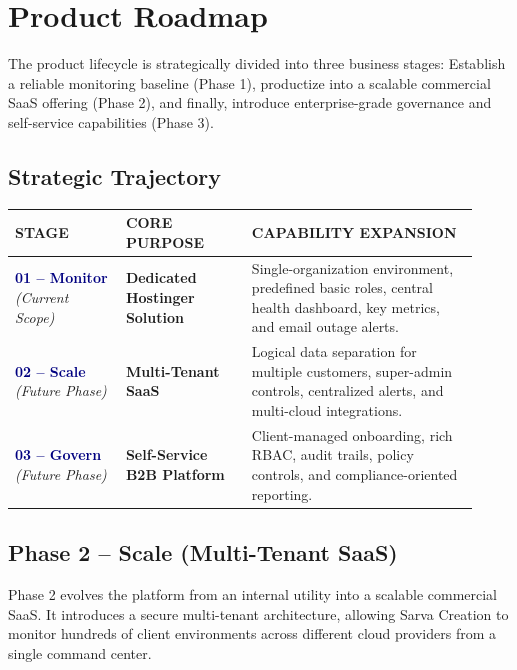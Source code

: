 \documentclass[11pt,a4paper]{article}
\newcommand{\thd}[1]{\textsc{\bfseries\color{white}\fontsize{8.6}{8.6}\selectfont #1}}
\begin{document}
\section{Product Roadmap}

The product lifecycle is strategically divided into three business stages: Establish a reliable monitoring baseline (Phase 1), productize into a scalable commercial SaaS offering (Phase 2), and finally, introduce enterprise-grade governance and self-service capabilities (Phase 3).

\vspace{1em}
\subsection{Strategic Trajectory}

\renewcommand{\arraystretch}{1.7}
\begin{tabular}{@{}>{\raggedright\arraybackslash}p{0.22\linewidth}>{\raggedright\arraybackslash}p{0.25\linewidth}p{0.45\linewidth}@{}}
\rowcolor{navy}
\thd{STAGE} & \thd{CORE PURPOSE} & \thd{CAPABILITY EXPANSION} \\
\midrule
\textbf{\textcolor{navy}{01 -- Monitor}} \newline \textit{(Current Scope)} & \textbf{Dedicated Hostinger Solution} & Single-organization environment, predefined basic roles, central health dashboard, key metrics, and email outage alerts. \\
\rowcolor{tabletint}
\textbf{\textcolor{navy}{02 -- Scale}} \newline \textit{(Future Phase)} & \textbf{Multi-Tenant SaaS} & Logical data separation for multiple customers, super-admin controls, centralized alerts, and multi-cloud integrations. \\
\textbf{\textcolor{navy}{03 -- Govern}} \newline \textit{(Future Phase)} & \textbf{Self-Service B2B Platform} & Client-managed onboarding, rich RBAC, audit trails, policy controls, and compliance-oriented reporting. \\
\bottomrule
\end{tabular}
\vspace{2em}

\subsection{Phase 2 -- Scale (Multi-Tenant SaaS)}
Phase 2 evolves the platform from an internal utility into a scalable commercial SaaS. It introduces a secure multi-tenant architecture, allowing Sarva Creation to monitor hundreds of client environments across different cloud providers from a single command center.
\end{document}
